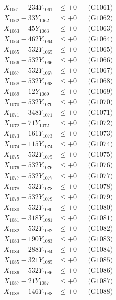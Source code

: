 \documentclass[a4paper,10pt]{article}
\begin{document}
{\begin{align}
\allowbreak
X_{1061} - 234Y_{1061} &\leq +0 && \text{(G1061)} \\
X_{1062} - 33Y_{1062} &\leq +0 && \text{(G1062)} \\
X_{1063} - 45Y_{1063} &\leq +0 && \text{(G1063)} \\
X_{1064} - 462Y_{1064} &\leq +0 && \text{(G1064)} \\
X_{1065} - 532Y_{1065} &\leq +0 && \text{(G1065)} \\
X_{1066} - 532Y_{1066} &\leq +0 && \text{(G1066)} \\
X_{1067} - 532Y_{1067} &\leq +0 && \text{(G1067)} \\
X_{1068} - 532Y_{1068} &\leq +0 && \text{(G1068)} \\
X_{1069} - 12Y_{1069} &\leq +0 && \text{(G1069)} \\
X_{1070} - 532Y_{1070} &\leq +0 && \text{(G1070)} \\
\allowbreak
X_{1071} - 348Y_{1071} &\leq +0 && \text{(G1071)} \\
X_{1072} - 71Y_{1072} &\leq +0 && \text{(G1072)} \\
X_{1073} - 161Y_{1073} &\leq +0 && \text{(G1073)} \\
X_{1074} - 115Y_{1074} &\leq +0 && \text{(G1074)} \\
X_{1075} - 532Y_{1075} &\leq +0 && \text{(G1075)} \\
X_{1076} - 532Y_{1076} &\leq +0 && \text{(G1076)} \\
X_{1077} - 532Y_{1077} &\leq +0 && \text{(G1077)} \\
X_{1078} - 532Y_{1078} &\leq +0 && \text{(G1078)} \\
X_{1079} - 532Y_{1079} &\leq +0 && \text{(G1079)} \\
X_{1080} - 532Y_{1080} &\leq +0 && \text{(G1080)} \\
\allowbreak
X_{1081} - 318Y_{1081} &\leq +0 && \text{(G1081)} \\
X_{1082} - 532Y_{1082} &\leq +0 && \text{(G1082)} \\
X_{1083} - 190Y_{1083} &\leq +0 && \text{(G1083)} \\
X_{1084} - 288Y_{1084} &\leq +0 && \text{(G1084)} \\
X_{1085} - 321Y_{1085} &\leq +0 && \text{(G1085)} \\
X_{1086} - 532Y_{1086} &\leq +0 && \text{(G1086)} \\
X_{1087} - 21Y_{1087} &\leq +0 && \text{(G1087)} \\
X_{1088} - 146Y_{1088} &\leq +0 && \text{(G1088)} \\

\end{align}}
\end{document}
